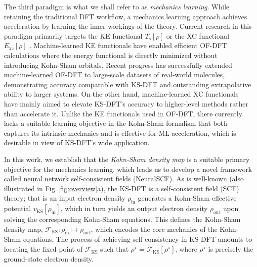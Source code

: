 \documentclass[%
reprint,
superscriptaddress,
bibnotes,
amsmath,amssymb,
aps,
floatfix, %
]{revtex4-2}
\begin{document}
The third paradigm is what we shall refer to as \textit{mechanics learning}. While retaining the traditional DFT workflow, a mechanics learning approach achieves acceleration by learning the inner workings of the theory. Current research in this paradigm primarily targets the KE functional $T_\text{s}[\rho]$ \cite{snyder2012finding, meyer2020, imoto2021, ryczko2022toward, remme2023kinetic, zhang2024ofdft} or the XC functional $E_\text{xc}[\rho]$ \cite{li2021kohn, kasim2021learning, chen2021deepks, kirkpatrick2021pushing}. Machine-learned KE functionals have enabled efficient OF-DFT calculations \cite{mi2023orbital} where the energy functional is directly minimized without introducing Kohn-Sham orbitals. Recent progress \cite{zhang2024ofdft} has successfully extended machine-learned OF-DFT to large-scale datasets of real-world molecules, demonstrating accuracy comparable with KS-DFT and outstanding extrapolative ability to larger systems. On the other hand, machine-learned XC functionals have mainly aimed to elevate KS-DFT's accuracy to higher-level methods rather than accelerate it. Unlike the KE functionals used in OF-DFT, there currently lacks a suitable learning objective in the Kohn-Sham formalism that both captures its intrinsic mechanics and is effective for ML acceleration, which is desirable in view of KS-DFT's wide application.

In this work, we establish that the \textit{Kohn-Sham density map} is a suitable primary objective for the mechanics learning, which leads us to develop a novel framework called neural network self-consistent fields (NeuralSCF). As is well-known (also illustrated in Fig.\,\ref{fig:overview}a), the KS-DFT is a self-consistent field (SCF) theory; that is an input electron density $\rho_\text{in}$ generates a Kohn-Sham effective potential $v_\text{KS}[\rho_\text{in}]$, which in turn yields an output electron density $\rho_\text{out}$ upon solving the corresponding Kohn-Sham equations. This defines the Kohn-Sham density map, $\mathcal{F}_\text{KS}: \rho_\text{in} \mapsto \rho_\text{out}$, which encodes the core mechanics of the Kohn-Sham equations. The process of achieving self-consistency in KS-DFT amounts to locating the fixed point of $\mathcal{F}_\text{KS}$ such that $\rho^\star = \mathcal{F}_\text{KS}[\rho^\star]$, where $\rho^\star$ is precisely the ground-state electron density.
\end{document}
